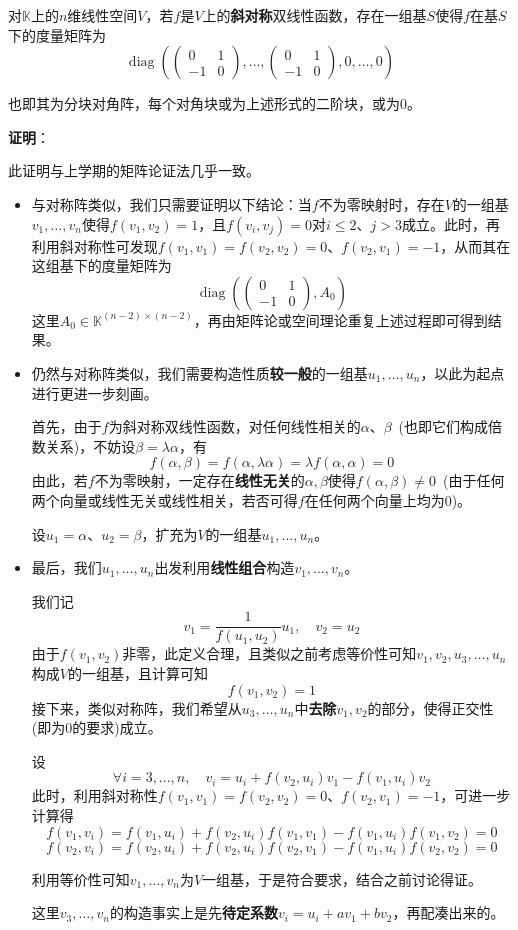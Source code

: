 \documentclass[a4paper,UTF8,fontset=windows,AutoFakeBold]{ctexart}
\DeclareMathOperator{\diag}{diag}
\newcommand*{\note}{\noindent *}
\newcommand{\proo}[1]{{\vspace{5pt}\kaishu\noindent\textbf{证明}：\vspace{-3pt}
\begin{compactitem}
    \item[] #1
\end{compactitem}
}}
\begin{document}
对$\mathbb{K}$上的$n$维线性空间$V$，若$f$是$V$上的\textbf{斜对称}双线性函数，存在一组基$S$使得$f$在基$S$下的度量矩阵为
$$\diag\left(\begin{pmatrix}0&1\\-1&0\end{pmatrix},\dots,\begin{pmatrix}0&1\\-1&0\end{pmatrix},0,\dots,0\right)$$

\note 也即其为分块对角阵，每个对角块或为上述形式的二阶块，或为0。

\proo{
    \note 此证明与上学期的矩阵论证法几乎一致。

    \begin{itemize}
        \item 与对称阵类似，我们只需要证明以下结论：当$f$不为零映射时，存在$V$的一组基$v_1,\dots,v_n$使得$f(v_1,v_2)=1$，且$f(v_i,v_j)=0$对$i\le2$、$j>3$成立。此时，再利用斜对称性可发现$f(v_1,v_1)=f(v_2,v_2)=0$、$f(v_2,v_1)=-1$，从而其在这组基下的度量矩阵为
        $$\diag\left(\begin{pmatrix}0&1\\-1&0\end{pmatrix},A_0\right)$$
        这里$A_0\in\mathbb{K}^{(n-2)\times(n-2)}$，再由矩阵论或空间理论重复上述过程即可得到结果。

        \item 仍然与对称阵类似，我们需要构造性质\textbf{较一般}的一组基$u_1,\dots,u_n$，以此为起点进行更进一步刻画。
        
        首先，由于$f$为斜对称双线性函数，对任何线性相关的$\alpha$、$\beta$\ (也即它们构成倍数关系)，不妨设$\beta=\lambda\alpha$，有
        $$f(\alpha,\beta)=f(\alpha,\lambda\alpha)=\lambda f(\alpha,\alpha)=0$$
        由此，若$f$不为零映射，一定存在\textbf{线性无关}的$\alpha,\beta$使得$f(\alpha,\beta)\ne0$\ (由于任何两个向量或线性无关或线性相关，若否可得$f$在任何两个向量上均为0)。

        设$u_1=\alpha$、$u_2=\beta$，扩充为$V$的一组基$u_1,\dots,u_n$。

        \item 最后，我们$u_1,\dots,u_n$出发利用\textbf{线性组合}构造$v_1,\dots,v_n$。
        
        我们记
        $$v_1=\frac{1}{f(u_1,u_2)}u_1,\quad v_2=u_2$$
        由于$f(v_1,v_2)$非零，此定义合理，且类似之前考虑等价性可知$v_1,v_2,u_3,\dots,u_n$构成$V$的一组基，且计算可知
        $$f(v_1,v_2)=1$$
        接下来，类似对称阵，我们希望从$u_3,\dots,u_n$中\textbf{去除}$v_1,v_2$的部分，使得正交性(即为0的要求)成立。

        设
        $$\forall i=3,\dots,n,\quad v_i=u_i+f(v_2,u_i)v_1-f(v_1,u_i)v_2$$
        此时，利用斜对称性$f(v_1,v_1)=f(v_2,v_2)=0$、$f(v_2,v_1)=-1$，可进一步计算得
        $$f(v_1,v_i)=f(v_1,u_i)+f(v_2,u_i)f(v_1,v_1)-f(v_1,u_i)f(v_1,v_2)=0$$
        $$f(v_2,v_i)=f(v_2,u_i)+f(v_2,u_i)f(v_2,v_1)-f(v_1,u_i)f   (v_2,v_2)=0$$

        利用等价性可知$v_1,\dots,v_n$为$V$一组基，于是符合要求，结合之前讨论得证。
        
        \note 这里$v_3,\dots,v_n$的构造事实上是先\textbf{待定系数}$v_i=u_i+av_1+bv_2$，再配凑出来的。
    \end{itemize}
}
\end{document}

